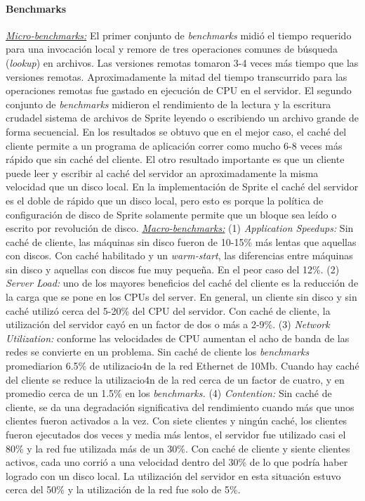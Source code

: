 \paragraph{\textnormal{\textbf{Benchmarks}}}
\underline{\emph{Micro-benchmarks:}} El primer conjunto de \emph{benchmarks} midió el tiempo requerido para una invocación local y remore de tres operaciones comunes de búsqueda (\emph{lookup}) en archivos. Las versiones remotas tomaron 3-4 veces más tiempo que las versiones remotas. Aproximadamente la mitad del tiempo transcurrido para las operaciones remotas fue gastado en ejecución de CPU en el servidor. El segundo conjunto de \emph{benchmarks} midieron el rendimiento de la lectura y la escritura crudadel sistema de archivos de Sprite leyendo o escribiendo un archivo grande de forma secuencial. En los resultados se obtuvo que en el mejor caso, el caché del cliente permite a un programa de aplicación correr como mucho 6-8 veces más rápido que sin caché del cliente. El otro resultado importante es que un cliente puede leer y escribir al caché del servidor an aproximadamente la misma velocidad que un disco local. En la implementación de Sprite el caché del servidor es el doble de rápido que un disco local, pero esto es porque la política de configuración de disco de Sprite solamente permite que un bloque sea leído o escrito por revolución de disco. \underline{\emph{Macro-benchmarks:}} (1) \emph{Application Speedups:} Sin caché de cliente, las máquinas sin disco fueron de 10-15\% más lentas que aquellas con discos. Con caché habilitado y un \emph{warm-start}, las diferencias entre máquinas sin disco y aquellas con discos fue muy pequeña. En el peor caso del 12\%. (2) \emph{Server Load:} uno de los mayores beneficios del caché del cliente es la reducción de la carga que se pone en los CPUs del server. En general, un cliente sin disco y sin caché utilizó cerca del 5-20\% del CPU del servidor. Con caché de cliente, la utilización del servidor cayó en un factor de dos o más a 2-9\%. (3) \emph{Network Utilization:} conforme las velocidades de CPU aumentan el acho de banda de las redes se convierte en un problema. Sin caché de cliente los \emph{benchmarks} promediarion 6.5\% de utilizacio4n de la red Ethernet de 10Mb. Cuando hay caché del cliente se reduce la utilizacio4n de la red cerca de un factor de cuatro, y en promedio cerca de un 1.5\% en los \emph{benchmarks.} (4) \emph{Contention:} Sin caché de cliente, se da una degradación significativa del rendimiento cuando más que unos clientes fueron activados a la vez. Con siete clientes y ningún caché, los clientes fueron ejecutados dos veces y media más lentos, el servidor fue utilizado casi el 80\% y la red fue utilizada más de un 30\%. Con caché de cliente y siente clientes activos, cada uno corrió a una velocidad dentro del 30\% de lo que podría haber logrado con un disco local. La utilización del servidor en esta situación estuvo cerca del 50\% y la utilización de la red fue solo de 5\%.

